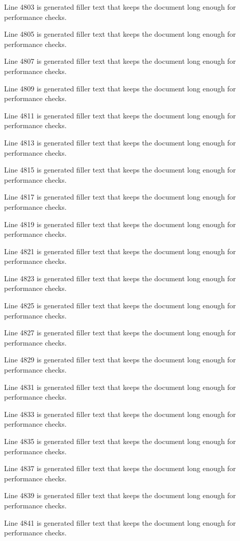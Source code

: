 Line 4803 is generated filler text that keeps the document long enough for performance checks.

Line 4805 is generated filler text that keeps the document long enough for performance checks.

Line 4807 is generated filler text that keeps the document long enough for performance checks.

Line 4809 is generated filler text that keeps the document long enough for performance checks.

Line 4811 is generated filler text that keeps the document long enough for performance checks.

Line 4813 is generated filler text that keeps the document long enough for performance checks.

Line 4815 is generated filler text that keeps the document long enough for performance checks.

Line 4817 is generated filler text that keeps the document long enough for performance checks.

Line 4819 is generated filler text that keeps the document long enough for performance checks.

Line 4821 is generated filler text that keeps the document long enough for performance checks.

Line 4823 is generated filler text that keeps the document long enough for performance checks.

Line 4825 is generated filler text that keeps the document long enough for performance checks.

Line 4827 is generated filler text that keeps the document long enough for performance checks.

Line 4829 is generated filler text that keeps the document long enough for performance checks.

Line 4831 is generated filler text that keeps the document long enough for performance checks.

Line 4833 is generated filler text that keeps the document long enough for performance checks.

Line 4835 is generated filler text that keeps the document long enough for performance checks.

Line 4837 is generated filler text that keeps the document long enough for performance checks.

Line 4839 is generated filler text that keeps the document long enough for performance checks.

Line 4841 is generated filler text that keeps the document long enough for performance checks.

